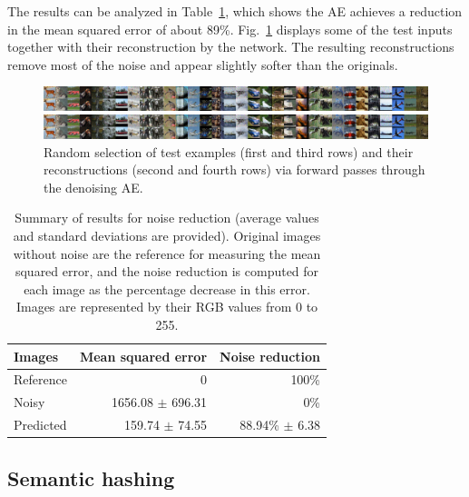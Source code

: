 \documentclass[
	fontsize=11pt, %
	twoside=false, %
	open=any, %
	secnumdepth=1, %
]{kaobook}
\begin{document}
The results can be analyzed in Table~\ref{tbl:noisered}, which shows the AE achieves a reduction in the mean squared error of about 89\%. Fig.~\ref{fig:denoised} displays some of the test inputs together with their reconstruction by the network. The resulting reconstructions remove most of the noise and appear slightly softer than the originals. 

\begin{figure}[ht]
    \centering
    \includegraphics[width=\linewidth,trim={768px 0 1536px 0},clip]{denoising-predictions.png}

    \includegraphics[width=\linewidth,trim={1536px 0 768px 0},clip]{denoising-predictions.png}
    \caption{\label{fig:denoised}Random selection of test examples (first and third rows) and their reconstructions (second and fourth rows) via forward passes through the denoising AE.}
\end{figure}

\begin{table}
    \centering
    \begin{tabular}{lrr}
        \toprule
            Images & Mean squared error & Noise reduction \\
        \midrule
        Reference & 0 & 100\% \\ 
        Noisy & 1656.08  $\pm$ 696.31 & 0\%\\
        Predicted &  159.74 $\pm$ 74.55 & 88.94\% $\pm$ 6.38\\
        \bottomrule
    \end{tabular}

    \caption{\label{tbl:noisered}Summary of results for noise reduction (average values and standard deviations are provided). Original images without noise are the reference for measuring the mean squared error, and the noise reduction is computed for each image as the percentage decrease in this error. Images are represented by their RGB values from 0 to 255.}
\end{table}


\subsection{Semantic hashing}
\end{document}
